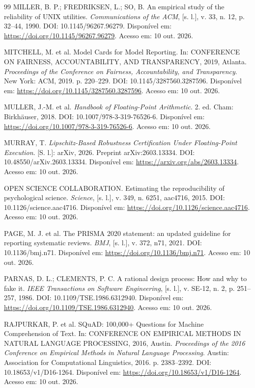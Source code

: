\begin{thebibliography}{99}
 MILLER, B. P.; FREDRIKSEN, L.; SO, B. An empirical study of the reliability of UNIX utilities. \textit{Communications of the ACM}, [s. l.], v. 33, n. 12, p. 32--44, 1990. DOI: 10.1145/96267.96279. Disponível em: \url{https://doi.org/10.1145/96267.96279}. Acesso em: 10 out. 2026.

 MITCHELL, M. et al. Model Cards for Model Reporting. In: CONFERENCE ON FAIRNESS, ACCOUNTABILITY, AND TRANSPARENCY, 2019, Atlanta. \textit{Proceedings of the Conference on Fairness, Accountability, and Transparency}. New York: ACM, 2019. p. 220--229. DOI: 10.1145/3287560.3287596. Disponível em: \url{https://doi.org/10.1145/3287560.3287596}. Acesso em: 10 out. 2026.

 MULLER, J.-M. et al. \textit{Handbook of Floating-Point Arithmetic}. 2. ed. Cham: Birkhäuser, 2018. DOI: 10.1007/978-3-319-76526-6. Disponível em: \url{https://doi.org/10.1007/978-3-319-76526-6}. Acesso em: 10 out. 2026.

 MURRAY, T. \textit{Lipschitz-Based Robustness Certification Under Floating-Point Execution}. [S. l.]: arXiv, 2026. Preprint arXiv:2603.13334. DOI: 10.48550/arXiv.2603.13334. Disponível em: \url{https://arxiv.org/abs/2603.13334}. Acesso em: 10 out. 2026.

 OPEN SCIENCE COLLABORATION. Estimating the reproducibility of psychological science. \textit{Science}, [s. l.], v. 349, n. 6251, aac4716, 2015. DOI: 10.1126/science.aac4716. Disponível em: \url{https://doi.org/10.1126/science.aac4716}. Acesso em: 10 out. 2026.

 PAGE, M. J. et al. The PRISMA 2020 statement: an updated guideline for reporting systematic reviews. \textit{BMJ}, [s. l.], v. 372, n71, 2021. DOI: 10.1136/bmj.n71. Disponível em: \url{https://doi.org/10.1136/bmj.n71}. Acesso em: 10 out. 2026.

 PARNAS, D. L.; CLEMENTS, P. C. A rational design process: How and why to fake it. \textit{IEEE Transactions on Software Engineering}, [s. l.], v. SE-12, n. 2, p. 251--257, 1986. DOI: 10.1109/TSE.1986.6312940. Disponível em: \url{https://doi.org/10.1109/TSE.1986.6312940}. Acesso em: 10 out. 2026.

 RAJPURKAR, P. et al. SQuAD: 100,000+ Questions for Machine Comprehension of Text. In: CONFERENCE ON EMPIRICAL METHODS IN NATURAL LANGUAGE PROCESSING, 2016, Austin. \textit{Proceedings of the 2016 Conference on Empirical Methods in Natural Language Processing}. Austin: Association for Computational Linguistics, 2016. p. 2383--2392. DOI: 10.18653/v1/D16-1264. Disponível em: \url{https://doi.org/10.18653/v1/D16-1264}. Acesso em: 10 out. 2026.


\end{thebibliography}
